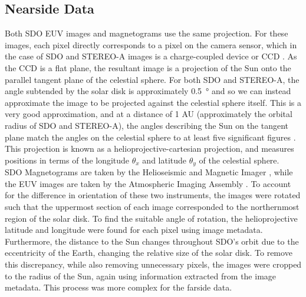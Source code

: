 \documentclass[11pt,a4paper,onecolumn]{report}
\begin{document}
\subsection{Nearside Data}
Both SDO EUV images and magnetograms use the same projection. For
these images, each pixel directly corresponds to a pixel on the camera sensor,
which in the case of SDO and STEREO-A images is a charge-coupled device or
CCD \citep{kaiser_stereo_2008,lemen_atmospheric_2012}. As the CCD is a flat plane,
the resultant image is a projection of the Sun onto the parallel tangent plane of the
celestial sphere.
For both SDO and STEREO-A, the angle subtended by the solar disk is
approximately \SI[]{0.5}[]{\degree} and so we can instead approximate the image
to be projected against the celestial sphere itself. This is a very good
approximation, and at a distance of 1 AU (approximately the orbital radius of
SDO and STEREO-A), the angles describing the Sun on the tangent plane match the
angles on the celestial sphere to at least five significant figures
\citep{thompson_w_t_coordinate_2006}. This projection is known as a
helioprojective-cartesian projection, and measures positions in terms of the
longitude \(\theta_x\) and latitude \(\theta_y\) of the celestial sphere.\\

SDO Magnetograms are taken by the Helioseismic and Magnetic Imager
\citep{scherrer_helioseismic_2012}, while the EUV images are taken by the
Atmospheric Imaging Assembly \citep{lemen_atmospheric_2012}. To account for the
difference in orientation of these two instruments, the images were rotated such
that the uppermost section of each image corresponded to the northernmost region
of the solar disk. To find the suitable angle of rotation, the helioprojective
latitude and longitude were found for each pixel using image metadata.
Furthermore, the distance to the Sun changes throughout SDO's orbit due to the
eccentricity of the Earth, changing the relative size of the solar disk. To
remove this discrepancy, while also removing unnecessary pixels, the images were
cropped to the radius of the Sun, again using information extracted from the
image metadata. This process was more complex for the farside data.
\end{document}
